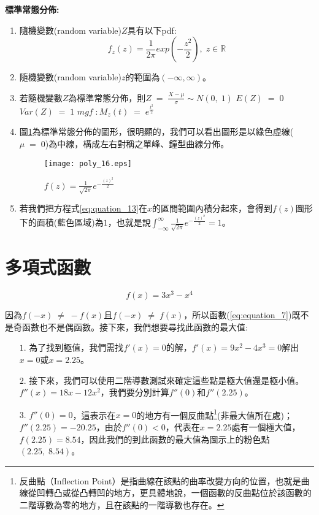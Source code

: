 \documentclass[12pt, a4paper]{article}
\begin{document}
\textbf{標準常態分佈\;:}
\begin{enumerate}
\item 隨機變數(random variable)\;$Z$\;具有以下pdf\;:
\begin{equation}\label{eq:quation_13}
f_z(z) = \frac{1}{2\pi} exp(-\frac{z^2}{2}),\; z \in \mathbb{R}
\end{equation}
\item 隨機變數(random variable)\;$z$\;的範圍為\;$(-\infty, \infty)$\;。
\item 若隨機變數\;$Z$\;為標準常態分佈，則\;$Z\;=\;\frac{X-\mu}{\sigma}\sim N(0,\; 1)$\;
\subitem $E(Z)\;=\;0$
\subitem $Var(Z)\;=\;1$
\subitem $mgf\;:M_z(t)\;=\;e^{\frac{t^2}{2}}$
\item 圖\;\ref{fig:poly_16.eps}\;為標準常態分佈的圖形，很明顯的，我們可以看出圖形是以綠色虛線(\;$\mu\;=\;0$\;)為中線，構成左右對稱之單峰、鐘型曲線分佈。
\begin{figure}[h]
\centering
\texttt{[image: poly\_16.eps]}
\caption{$f(z) = \frac{1}{\sqrt{2\pi}}e^{-\frac{(z)^2}{2}}$}
\label{fig:poly_16.eps}
\end{figure}
\item 若我們把方程式\;\ref{eq:quation_13}\;在\;$x$\;的區間範圍內積分起來，會得到\;$f(z)$\;圖形下的面積(藍色區域)為\;$1$\;，也就是說\;$\int_{-\infty}^{\infty} \frac{1}{\sqrt{2\pi}}e^{-\frac{(z)^2}{2}}=1$\;。
\end{enumerate}

\section{多項式函數}
\begin{equation}\label{eq:equation_7}
f(x) = 3x^3-x^4
\end{equation}

因為\;$f(-x)\;\neq\;-f(x)$\;且\;$f(-x)\;\neq\;f(x)$\;，所以函數\;(\ref{eq:equation_7})\;既不是奇函數也不是偶函數。接下來，我們想要尋找此函數的最大值\;:
\begin{enumerate}
\item[$1$.]
為了找到極值，我們需找\;$f'(x)=0$\;的解，\;$f'(x)=9x^2-4x^3=0$\;解出\\\;$x=0$\;或\;$x=2.25$\;。
\item[$2$.]
接下來，我們可以使用二階導數測試來確定這些點是極大值還是極小值。\;$f''(x)=18x-12x^2$\;，我們要分別計算\;$f''(0)$\;和\;$f''(2.25)$\;。
\item[$3$.]
$f''(0)=0$\;，這表示在\;$x=0$\;的地方有一個反曲點\footnote{反曲點（Inflection Point）是指曲線在該點的曲率改變方向的位置，也就是曲線從凹轉凸或從凸轉凹的地方，更具體地說，一個函數的反曲點位於該函數的二階導數為零的地方，且在該點的一階導數也存在。}(非最大值所在處)；\;$f''(2.25)=-20.25$\;，由於\;$f''(0)<0$\;，代表在\;$x=2.25$\;處有一個極大值，\;$f(2.25)=8.54$\;，因此我們的到此函數的最大值為圖示上的粉色點\;$(2.25,\;8.54)$\;。
\end{enumerate}
\end{document}
